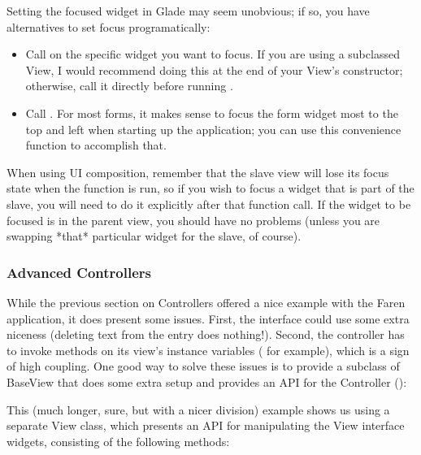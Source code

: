 \documentclass[a4paper]{howto}
\begin{document}
Setting the focused widget in Glade may seem unobvious; if so, you have
alternatives to set focus programatically:

\begin{itemize}
\item Call  on the specific widget you want to focus.
If you are using a subclassed View, I would recommend doing this at the
end of your View's constructor; otherwise, call it directly before
running .
\item Call . For most forms, it makes sense
to focus the form widget most to the top and left when starting up the
application; you can use this convenience function to accomplish that.
\end{itemize}

When using UI composition, remember that the slave view will lose its
focus state when the function  is run, so if you
wish to focus a widget that is part of the slave, you will need to do it
explicitly after that function call. If the widget to be focused is in
the parent view, you should have no problems (unless you are swapping
*that* particular widget for the slave, of course).

\subsubsection{Advanced Controllers}

While the previous section on Controllers offered a nice example with
the Faren application, it does present some issues. First, the interface
could use some extra niceness (deleting text from the entry does
nothing!). Second, the controller has to invoke methods on its view's
instance variables ( for example),
which is a sign of high coupling. One good way to solve these issues is
to provide a subclass of BaseView that does some extra setup and
provides an API for the Controller ():



This (much longer, sure, but with a nicer division) example shows us
using a separate View class, which presents an API for manipulating the
View interface widgets, consisting of the following methods:
\end{document}
